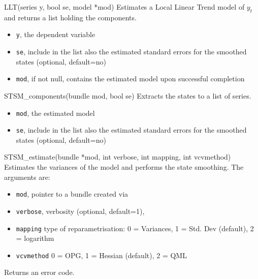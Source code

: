 \documentclass[a4paper,10pt]{article}
\begin{document}
\begin{funcdoc}{LLT(series y, bool se, model *mod)}
  Estimates a Local Linear Trend model of $y_t$ and returns a list
  holding the components.
  \begin{itemize}
  \item \texttt{y}, the dependent variable
  \item \texttt{se}, include in the list also the estimated standard
    errors for the smoothed states (optional, default=no)
  \item \texttt{mod}, if not null, contains the estimated model upon
    successful completion
  \end{itemize}
\end{funcdoc}

\begin{funcdoc}{STSM\_components(bundle mod, bool se)}
  Extracts the states to a list of series.
  \begin{itemize}
  \item \texttt{mod}, the estimated model
  \item \texttt{se}, include in the list also the estimated standard
    errors for the smoothed states (optional, default=no)
  \end{itemize}
\end{funcdoc}

\begin{funcdoc}{STSM\_estimate(bundle *mod, int verbose, int mapping,
    int vcvmethod)}
  Estimates the variances of the model and performs the state
  smoothing. The arguments are:
  \begin{itemize}
  \item \texttt{mod}, pointer to a bundle created via 
  \item \texttt{verbose}, verbosity (optional, default=1),
  \item \texttt{mapping} type of reparametrisation: 0 = Variances, 1 =
    Std. Dev (default), 2 = logarithm
  \item \texttt{vcvmethod} 0 = OPG, 1 = Hessian (default), 2 = QML
  \end{itemize}

  Returns an error code.
\end{funcdoc}
\end{document}
